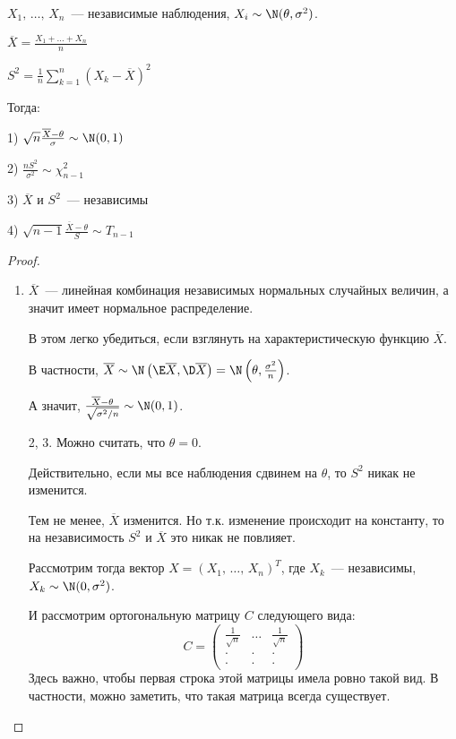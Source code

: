 \begin{nmlemma}[Фишера]
	\slashns
	
	$X_1, \, \ldots, \, X_n$~--- независимые наблюдения, $X_i \sim \N(\theta, \sigma^2)$.
	
	$\overline{X} = \frac{X_1 + \ldots + X_n}{n}$
	
	$S^2 = \frac1n \sum_{k=1}^{n} (X_k - \overline{X})^2$
	
	Тогда:
	
	1) $\sqrt{n} \frac{\overline{X} - \theta}{\sigma} \sim \N(0, 1)$
	
	2) $\frac{nS^2}{\sigma^2} \sim \chi_{n-1}^2$
	
	3) $\overline{X}$ и $S^2$~--- независимы
	
	4) $\sqrt{n-1} \frac{\overline{X} - \theta}{S} \sim T_{n-1}$

	\begin{proof}
		\slashns
		
		\begin{enumerate}
			\item 
			$\overline{X}$~--- линейная комбинация независимых нормальных случайных величин, а значит имеет нормальное распределение.
			
			В этом легко убедиться, если взглянуть на характеристическую функцию $\overline{X}$.
			
			В частности, $\overline{X} \sim \N \left(\E \overline{X}, \D \overline{X}\right) = \N \left(\theta, \frac{\sigma^2}{n}\right)$.
			
			А значит, $\frac{\overline{X} - \theta}{\sqrt{\sigma^2/n}} \sim \N(0, 1)$.
			
			\item[2, 3.]  
			Можно считать, что $\theta = 0$.
			
			Действительно, если мы все наблюдения сдвинем на $\theta$, то $S^2$ никак не изменится.
			
			Тем не менее, $\overline{X}$ изменится. Но т.к. изменение происходит на константу, то на независимость $S^2$ и $\overline{X}$ это никак не повлияет.
			
			Рассмотрим тогда вектор $X = (X_1, \, \ldots, \, X_n)^T$, где $X_k$~--- независимы, $X_k \sim \N(0, \sigma^2)$.
			
			И рассмотрим ортогональную матрицу $C$ следующего вида:
			$$C = \begin{pmatrix}
			\frac{1}{\sqrt{n}} & \ldots & \frac{1}{\sqrt{n}}\\
			\cdot & \cdot & \cdot\\
			\cdot & \cdot & \cdot
			\end{pmatrix}$$
			Здесь важно, чтобы первая строка этой матрицы имела ровно такой вид. В частности, можно заметить, что такая матрица всегда существует.
			

\end{enumerate}
\end{proof}
\end{nmlemma}
